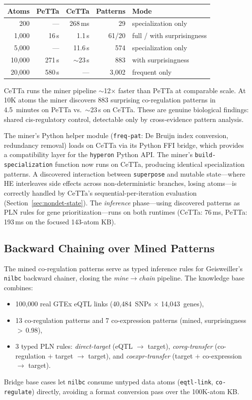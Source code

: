 \documentclass[11pt]{article}
\newcommand{\code}[1]{\texttt{#1}}
\newcommand{\PeTTa}{\textup{PeTTa}}
\newcommand{\HE}{\textup{HE}}
\newcommand{\CeTTa}{\textup{CeTTa}}
\begin{document}
\begin{center}
\begin{tabular}{rrrrl}
\toprule
Atoms & \PeTTa{} & \CeTTa{} & Patterns & Mode \\
\midrule
200    & ---      & 268\,ms  &  29 & specialization only \\
1{,}000  & 16\,s   & 1.1\,s  & 61/20  & full / with surprisingness \\
5{,}000  & ---     & 11.6\,s  & 574 & specialization only \\
10{,}000 & 271\,s  & $\sim$23\,s & 883 & with surprisingness \\
20{,}000 & 580\,s  & ---     & 3{,}002 & frequent only \\
\bottomrule
\end{tabular}
\end{center}

\CeTTa{} runs the miner pipeline $\sim$12$\times$ faster than \PeTTa{}
at comparable scale.  At 10K atoms the miner discovers 883 surprising
co-regulation patterns in 4.5~minutes on \PeTTa{} vs.\ $\sim$23\,s on
\CeTTa{}.  These are genuine biological findings: shared cis-regulatory
control, detectable only by cross-evidence pattern analysis.

The miner's Python helper module (\code{freq-pat}: De Bruijn index
conversion, redundancy removal) loads on \CeTTa{} via its Python FFI
bridge, which provides a compatibility layer for the \code{hyperon}
Python API\@.  The miner's \code{build-specialization} function now
runs on \CeTTa{}, producing identical specialization patterns.
A discovered interaction between \code{superpose} and mutable
state---where \HE{} interleaves side effects across non-deterministic
branches, losing atoms---is correctly handled by \CeTTa{}'s
sequential-per-iteration evaluation (Section~\ref{sec:nondet-state}).
The \emph{inference} phase---using discovered patterns as PLN rules
for gene prioritization---runs on both runtimes (\CeTTa{}: 76\,ms,
\PeTTa{}: 193\,ms on the focused 143-atom KB).

\subsection{Backward Chaining over Mined Patterns}

The mined co-regulation patterns serve as typed inference rules for
Geisweiller's \code{nilbc} backward chainer, closing the
\emph{mine$\to$chain} pipeline.  The knowledge base combines:
\begin{itemize}
\item 100{,}000 real GTEx eQTL links (40{,}484~SNPs $\times$ 14{,}043~genes),
\item 13 co-regulation patterns and 7 co-expression patterns (mined,
  surprisingness $>$\,0.98),
\item 3 typed PLN rules: \emph{direct-target} (eQTL $\to$ target),
  \emph{coreg-transfer} (co-regulation $+$ target $\to$ target), and
  \emph{coexpr-transfer} (target $+$ co-expression $\to$ target).
\end{itemize}
Bridge base cases let \code{nilbc} consume untyped data atoms
(\code{eqtl-link}, \code{co-regulate}) directly, avoiding a format
conversion pass over the 100K-atom KB\@.
\end{document}
